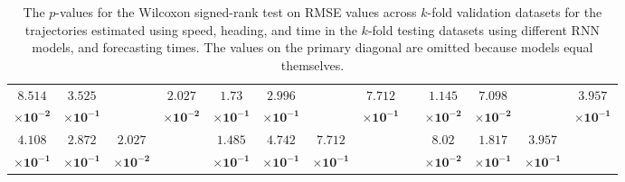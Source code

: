 \begin{table}[!ht]
{\begin{tabular}{|c|c|c|c|c|c|c|c|c|c|c|c|c|c|}
			$\mathbf{8.514}$ & $\mathbf{3.525}$ & \multirow{2}{*}{} & $\mathbf{2.027}$ & $\mathbf{1.73}$ & $\mathbf{2.996}$ & \multirow{2}{*}{} & $\mathbf{7.712}$ & \multicolumn{2}{c}{} & $\mathbf{1.145}$ & $\mathbf{7.098}$ & \multirow{2}{*}{} & $\mathbf{3.957}$\\ 
			$\mathbf{\times 10^{-2}}$ & $\mathbf{\times 10^{-1}}$ & & $\mathbf{\times 10^{-2}}$ & $\mathbf{\times 10^{-1}}$ & $\mathbf{\times 10^{-1}}$ & & $\mathbf{\times 10^{-1}}$ & \multicolumn{2}{c}{} & $\mathbf{\times 10^{-2}}$ & $\mathbf{\times 10^{-2}}$ & & $\mathbf{\times 10^{-1}}$\\ \cline{1-8} \cline{11-14}
			$\mathbf{4.108}$ & $\mathbf{2.872}$ & $\mathbf{2.027}$ & \multirow{2}{*}{} & $\mathbf{1.485}$ & $\mathbf{4.742}$ & $\mathbf{7.712}$ & \multirow{2}{*}{} & \multicolumn{2}{c}{} & $\mathbf{8.02}$ & $\mathbf{1.817}$ & $\mathbf{3.957}$ & \multirow{2}{*}{} \\ 
			$\mathbf{\times 10^{-1}}$ & $\mathbf{\times 10^{-1}}$ & $\mathbf{\times 10^{-2}}$ & & $\mathbf{\times 10^{-1}}$ & $\mathbf{\times 10^{-1}}$ & $\mathbf{\times 10^{-1}}$ & & \multicolumn{2}{c}{} & $\mathbf{\times 10^{-2}}$ & $\mathbf{\times 10^{-1}}$ & $\mathbf{\times 10^{-1}}$ & \\ \cline{1-8} \cline{10-14}
		\end{tabular}
	}
	\caption{The $p$-values for the Wilcoxon signed-rank test on RMSE values across $k$-fold validation datasets for the trajectories estimated using speed, heading, and time in the $k$-fold testing datasets using different RNN models, and forecasting times. The values on the primary diagonal are omitted because models equal themselves.}
	\label{tab:var_speed actual dir_RMSE}
\end{table}